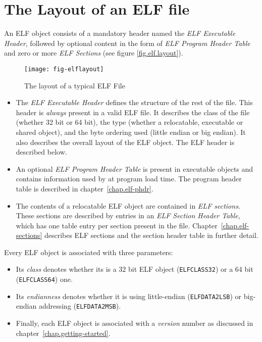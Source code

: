 \documentclass[a4paper]{report}
\newcommand{\constant}[1]{\texttt{#1}}
\newcommand{\firstterm}[1]{\textit{#1}}                 %
\begin{document}
\section{The Layout of an ELF file}

An ELF object consists of a mandatory header named the \firstterm{ELF
  Executable Header}, followed by optional content in the form of
\firstterm{ELF Program Header Table} and zero or more \firstterm{ELF
  Sections} (see figure \vref{fig.elf.layout}).

\begin{figure}
  \caption{The layout of a typical ELF File}\label{fig.elf.layout}
  \begin{center}
    \texttt{[image: fig-elflayout]}
  \end{center}
\end{figure}

\begin{itemize}
\item The \firstterm{ELF Executable Header} defines the structure of
  the rest of the file.  This header is \emph{always} present in a
  valid ELF file.  It describes the class of the file (whether 32 bit
  or 64 bit), the type (whether a relocatable, executable or shared
  object), and the byte ordering used (little endian or big endian).
  It also describes the overall layout of the ELF object.  The ELF
  header is described below.

\item An optional \firstterm{ELF Program Header Table} is present in
  executable objects and contains information used by at program load
  time.  The program header table is described in
  chapter~\vref{chap.elf-phdr}.

\item The contents of a relocatable ELF object are contained in
  \firstterm{ELF sections}.  These sections are described by entries
  in an \firstterm{ELF Section Header Table}, which has one table
  entry per section present in the file.
  Chapter~\vref{chap.elf-sections} describes ELF sections and the
  section header table in further detail.
\end{itemize}

Every ELF object is associated with three parameters:

\begin{itemize}
\item Its \firstterm{class} denotes whether its is a 32 bit ELF object
  (\constant{ELFCLASS32}) or a 64 bit (\constant{ELFCLASS64}) one.
\item Its \firstterm{endianness} denotes whether it is using
  little-endian (\constant{ELFDATA2LSB}) or big-endian addressing
  (\constant{ELFDATA2MSB}).
\item Finally, each ELF object is associated with a
  \firstterm{version} number as discussed in
  chapter~\vref{chap.getting-started}.
\end{itemize}
\end{document}
